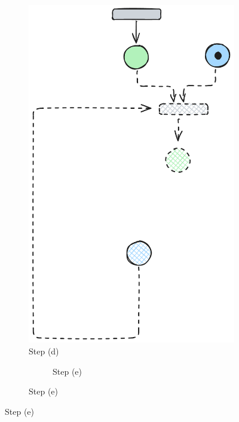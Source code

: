 \begin{figure}[htbp]
\begin{subfigure}[b]{0.23\textwidth}
		\includegraphics[width=\textwidth]{plots/bidirectional_pruning_step_d_forward.pdf}
		\caption{Step (d)}\label{fig:step:d}
	\end{subfigure}\hfill
	\begin{subfigure}[b]{0.23\textwidth}
		\centering
		\begin{subfigure}[b]{\textwidth}
			\caption{Step (e)}\label{fig:step:e}
		\end{subfigure}
		

\end{subfigure}
\end{figure}
